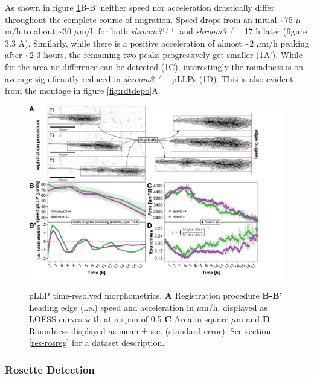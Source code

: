 \documentclass[11pt,singlespacinge,twoside]{reedthesis} %
\theoremstyle{definition}
\theoremstyle{definition}
\theoremstyle{definition}
\theoremstyle{remark}
\begin{document}
As shown in figure \ref{fig:rdtreg}B-B' neither speed nor acceleration drastically differ throughout the complete course of migration. Speed drops from an initial \textasciitilde75 \(\mu\)m/h to about \textasciitilde30 \(\mu\)m/h for both \emph{shroom3}\(^{+/+}\) and \emph{shroom3}\(^{-/-}\) 17 h later (figure 3.3 A). Similarly, while there is a positive acceleration of almost \textasciitilde2 \(\mu\)m/h peaking after \textasciitilde2-3 hours, the remaining two peaks progressively get smaller (\ref{fig:rdtreg}A').
While for the area no difference can be detected (\ref{fig:rdtreg}C), interestingly the roundness is on average significantly reduced in \emph{shroom3}\(^{-/-}\) pLLPs (\ref{fig:rdtreg}D). This is also evident from the montage in figure \ref{fig:rdtdepo}A.


\begin{figure}

{\centering \includegraphics[width=0.95\linewidth]{figures/results/03_rosettes/registration} 

}

\caption[pLLP time-resolved morphometrics]{pLLP time-resolved morphometrics. \textbf{A} Registration procedure \textbf{B-B'} Leading edge (l.e.) speed and acceleration in \(\mu\)m/h, displayed as LOESS curves with at a span of 0.5 \textbf{C} Area in square \(\mu\)m and \textbf{D} Roundness displayed as mean ± s.e. (standard error). See section \ref{res-rosreg} for a dataset description.}\label{fig:rdtreg}
\end{figure}
\hypertarget{res-rdtdet}{%
\subsubsection{Rosette Detection}\label{res-rdtdet}}
\end{document}
